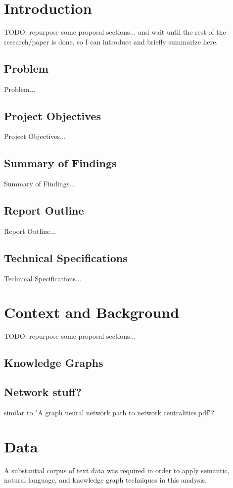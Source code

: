 \documentclass[11pt]{article}
\begin{document}
\newpage
\section{Introduction}
TODO: repurpose some proposal sections... and wait until the rest of the research/paper is done, so I can introduce and briefly summarize here.

\subsection{Problem}
Problem...
\subsection{Project Objectives}
Project Objectives...
\subsection{Summary of Findings}
Summary of Findings...
\subsection{Report Outline}
Report Outline...
\subsection{Technical Specifications}
Technical Specifications...

\section{Context and Background}
TODO: repurpose some proposal sections...
\subsection{Knowledge Graphs}
\subsection{Network stuff?}
similar to "A graph neural network path to network centralities.pdf"?



\section{Data}
A substantial corpus of text data was required in order to apply semantic, natural language, and knowledge graph techniques in this analysis.
\end{document}
